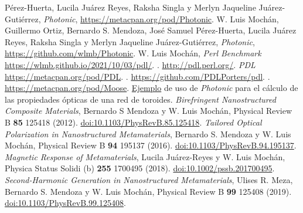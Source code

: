 \documentclass[12pt]{article}
\begin{document}
\begin{thebibliography}{0000}
  Pérez-Huerta, Lucila Juárez Reyes, Raksha Singla y Merlyn Jaqueline
  Juárez-Gutiérrez, {\em Photonic}, \url{https://metacpan.org/pod/Photonic}.
  W. Luis Mochán, Guillermo Ortiz, Bernardo S. Mendoza, José Samuel
  Pérez-Huerta, Lucila Juárez Reyes, Raksha Singla y Merlyn Jaqueline
  Juárez-Gutiérrez, {\em Photonic}, \url{https://github.com/wlmb/Photonic}.
W. Luis Mochán, {\em Perl Benchmark}
  \url{https://wlmb.github.io/2021/10/03/pdl/}.
.
  \url{http://pdl.perl.org/}.
 {\em PDL} \url{https://metacpan.org/pod/PDL}.
.  \url{https://github.com/PDLPorters/pdl}.
.
  \url{https://metacpan.org/pod/Moose}.
  \href{https://github.com/wlmb/Photonic/blob/master/examples/LE/NR2/toroid.pl}{Ejemplo}
    de uso de {\em Photonic} para el cálculo de las propiedades
    ópticas de una red de toroides.
  {\em Birefringent Nanostructured Composite
      Materials}, Bernardo S Mendoza y W. Luis Mochán, Physical Review
    B {\bf 85} 125418 (2012).
    \href{https://doi.org/10.1103/PhysRevB.85.125418}{doi:10.1103/PhysRevB.85.125418}.
 {\em Tailored Optical Polarization in Nanostructured
    Metamaterials},    Bernardo S. Mendoza y W. Luis Mochán,
  Physical Review B {\bf 94} 195137 (2016).
  \href{https://doi.org/10.1103/PhysRevB.94.195137}{doi:10.1103/PhysRevB.94.195137}.
 {\em Magnetic Response of Metamaterials}, Lucila
  Juárez-Reyes y W. Luis Mochán, Physica Status Solidi (b) {\bf 255}
  1700495 (2018).
  \href{https://doi.org/10.1002/pssb.201700495}{doi:10.1002/pssb.201700495}.
 {\em Second-Harmonic Generation in Nanostructured
    Metamaterials},  Ulises R. Meza, Bernardo S. Mendoza y W. Luis
  Mochán, Physical Review B {\bf 99} 125408
  (2019). \href{https://doi.org/10.1103/PhysRevB.99.125408}
  {doi:10.1103/PhysRevB.99.125408}.

\end{thebibliography}
\end{document}
